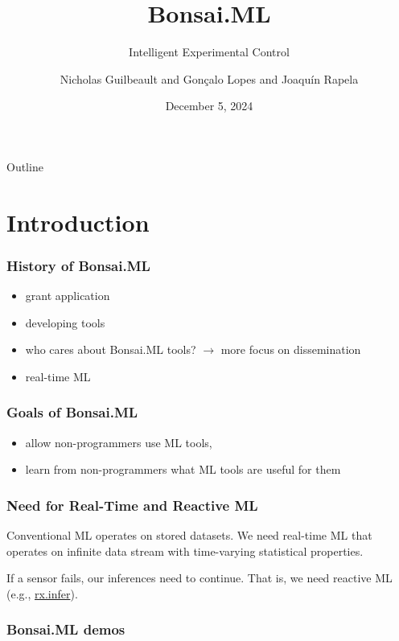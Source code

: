 \documentclass{beamer}
\title{Bonsai.ML}
\subtitle{Intelligent Experimental Control}
\author{Nicholas Guilbeault and Gon\c{c}alo Lopes and Joaqu\'{i}n Rapela}
\institute{Gatsby Computational Neuroscience Unit\\NeuroGEARS Ltd.}
\date{December 5, 2024}
\begin{document}
\begin{frame}
	\titlepage
\end{frame}

\begin{frame}{Outline}
    \tableofcontents
\end{frame}

\section{Introduction}

\begin{frame}
    \frametitle{History of Bonsai.ML}

    \begin{itemize}

        \item grant application

        \item developing tools

        \item who cares about Bonsai.ML tools? $\rightarrow$ more focus on
            dissemination

        \item real-time ML

    \end{itemize}
\end{frame}

\begin{frame}
    \frametitle{Goals of Bonsai.ML}

    \begin{itemize}
        \item allow non-programmers use ML tools,
        \item learn from non-programmers what ML tools are useful for them
    \end{itemize}
\end{frame}

\begin{frame}
    \frametitle{Need for Real-Time and Reactive ML}

    Conventional ML operates on stored datasets. We need real-time ML that
    operates on infinite data stream with time-varying statistical properties.

    If a sensor fails, our inferences need to continue. That is, we need
    reactive ML (e.g., \href{https://rxinfer.ml/}{rx.infer}).
\end{frame}

\begin{frame}
    \frametitle{Bonsai.ML demos}

\end{frame}
\end{document}
